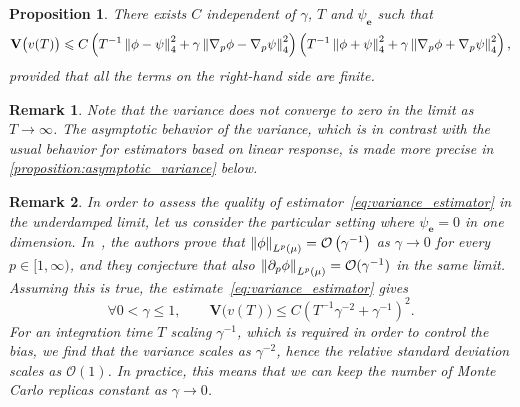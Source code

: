 \documentclass[11pt,a4paper]{article}
\newcommand{\var}[0]{\mathbf{V}}
\newcommand{\grad}{\nabla}
\newcommand{\vect}[1]{\boldsymbol{\mathbf #1}}
\theoremstyle{plain}
\newtheorem{proposition}{Proposition}[section]
\newtheorem{remark}{Remark}[section]
\numberwithin{equation}{section}
\renewcommand{\leq}{\leqslant}
\begin{document}
\begin{proposition}
    There exists $C$ independent of $\gamma$, $T$ and $\psi_{\vect e}$ such that
    \begin{equation}
        \label{eq:variance_estimator}
        \var \bigl(v(T)\bigr)
        \leq
        C \left( T^{-1} \norm{\phi - \psi}[4]^2  + \gamma \norm{\grad_p \phi - \grad_p \psi}[4]^2 \right)
        \left( T^{-1} \norm{\phi + \psi}[4]^2  + \gamma \norm{\grad_p \phi + \grad_p \psi}[4]^2 \right),
    \end{equation}
    provided that all the terms on the right-hand side are finite.
\end{proposition}
\begin{remark}
    Note that the variance does not converge to zero in the limit as $T \to \infty$.
    The asymptotic behavior of the variance,
    which is in contrast with the usual behavior for estimators based on linear response,
    is made more precise in \cref{proposition:asymptotic_variance} below.
\end{remark}
\begin{remark}
    In order to assess the quality of estimator~\eqref{eq:variance_estimator} in the underdamped limit,
    let us consider the particular setting where $\psi_{\vect e} = 0$ in one dimension.
    In~\cite[Remark 6.10]{MR2394704},
    the authors prove that $\norm{\phi}[\lp{p}{\mu}] = \bigo{\gamma^{-1}}$ as $\gamma \to 0$ for every $p \in [1, \infty)$,
    and they conjecture that also $\norm{\partial_p \phi}[\lp{p}{\mu}] = \mathcal O(\gamma^{-1})$ in the same limit.
    Assuming this is true, the estimate~\eqref{eq:variance_estimator} gives
    \begin{equation}
        \label{eq:variance_scaling}
        \forall 0 < \gamma \leq 1, \qquad
        \var \bigl(v(T)\bigr)
        \leq C \left( T^{-1} \gamma^{-2} + \gamma^{-1} \right)^2.
    \end{equation}
    For an integration time $T$ scaling $\gamma^{-1}$,
    which is required in order to control the bias,
    we find that the variance scales as $\gamma^{-2}$,
    hence the relative standard deviation scales as $\mathcal O(1)$.
    In practice, this means that we can keep the number of Monte Carlo replicas constant as $\gamma \to 0$.
\end{remark}
\end{document}
